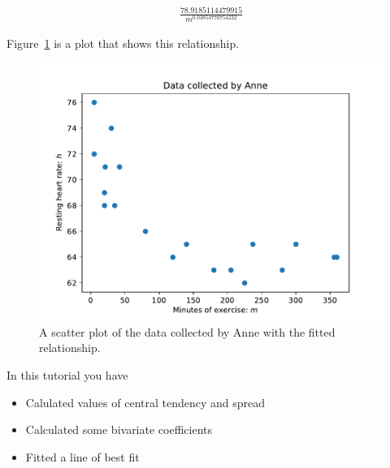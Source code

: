 \begin{equation*}
\begin{split}\displaystyle \frac{78.9185114479915}{m^{0.03854770754232}}\end{split}
\end{equation*}




Figure~\ref{fig:data_collected_by_anne_with_fitted_curve} is a plot that shows
this relationship.







\begin{figure}[!hbtp]
\begin{center}
\includegraphics[width=.7\textwidth]{./assets/data_collected_by_anne_with_fitted_curve/main.pdf}
\end{center}
\caption{A scatter plot of the data collected by Anne with the fitted
relationship.}
\label{fig:data_collected_by_anne_with_fitted_curve}
\end{figure}










\begin{note}
In this tutorial you have
\begin{itemize}
\item 

Calulated values of central tendency and spread

\item 

Calculated some bivariate coefficients

\item 

Fitted a line of best fit

\end{itemize}
\end{note}





